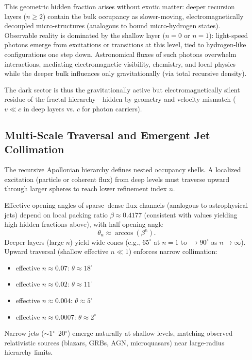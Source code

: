 \documentclass[11pt,a4paper]{article}
\begin{document}
This geometric hidden fraction arises without exotic matter: deeper recursion layers ($n \geq 2$) contain the bulk occupancy as slower-moving, electromagnetically decoupled micro-structures (analogous to bound micro-hydrogen states). Observable reality is dominated by the shallow layer ($n=0$ or $n=1$): light-speed photons emerge from excitations or transitions at this level, tied to hydrogen-like configurations one step down. Astronomical fluxes of such photons overwhelm interactions, mediating electromagnetic visibility, chemistry, and local physics while the deeper bulk influences only gravitationally (via total recursive density).

The dark sector is thus the gravitationally active but electromagnetically silent residue of the fractal hierarchy---hidden by geometry and velocity mismatch ($v \ll c$ in deep layers vs. $c$ for photon carriers).

\subsection{Multi-Scale Traversal and Emergent Jet Collimation}
The recursive Apollonian hierarchy defines nested occupancy shells. A localized excitation (particle or coherent flux) from deep levels must traverse upward through larger spheres to reach lower refinement index $n$.

Effective opening angles of sparse--dense flux channels (analogous to astrophysical jets) depend on local packing ratio $\beta \approx 0.4177$ (consistent with values yielding high hidden fractions above), with half-opening angle
\[
\theta_n \approx \arccos(\beta^n).
\]
Deeper layers (large $n$) yield wide cones (e.g., $65^\circ$ at $n=1$ to $\to 90^\circ$ as $n\to\infty$). Upward traversal (shallow effective $n \ll 1$) enforces narrow collimation:
\begin{itemize}
    \item effective $n \approx 0.07$: $\theta \approx 18^\circ$
    \item effective $n \approx 0.02$: $\theta \approx 11^\circ$
    \item effective $n \approx 0.004$: $\theta \approx 5^\circ$
    \item effective $n \approx 0.0007$: $\theta \approx 2^\circ$
\end{itemize}
Narrow jets ($\sim$1$^\circ$--20$^\circ$) emerge naturally at shallow levels, matching observed relativistic sources (blazars, GRBs, AGN, microquasars) near large-radius hierarchy limits.
\end{document}
